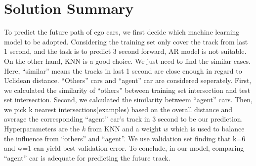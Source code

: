 \section{Solution Summary}
    To predict the future path of ego cars, we first decide which machine learning model to be adopted. Considering the training set only cover the track from last 1 second, and the task is to predict 3 second forward, AR model is not suitable. On the other hand, KNN is a good choice. We just need to find the similar cases. Here, ``similar'' means the tracks in last 1 second are close enough in regard to Uclidean distance. ``Others'' cars and ``agent'' car are considered seperately. First, we calculated the similarity of ``others'' between training set intersection and test set intersection. Second, we calculated the similarity betweem ``agent'' cars. Then, we pick k nearest intersections(examples) based on the overall distance and average the corresponding ``agent'' car's track in 3 second to be our prediction. \\
    Hyperparameters are the $k$ from KNN and a weight $w$ which is used to balance the influence from ``others'' and ``agent''. We use validation set finding that k=6 and w=1 can yield best validation error. To conclude, in our model, comparing ``agent'' car is adequate for predicting the future track.
